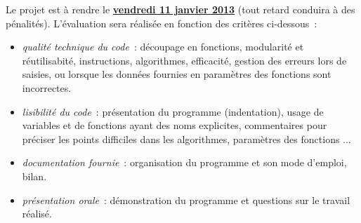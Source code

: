 \documentclass[10pt]{article}
\begin{document}
Le projet est à rendre le \underline{\bf vendredi 11 janvier 2013} 
(tout retard conduira à des pénalités). L'évaluation sera réalisée en fonction 
des critères ci-dessous~:
\begin{itemize}

\item  \textit{qualité technique du code}~: découpage en fonctions, modularité et réutilisabité, instructions, algorithmes, efficacité, gestion des erreurs lors de saisies, ou lorsque les données fournies en paramètres des fonctions sont incorrectes.

\item \textit{lisibilité du code}~: présentation du programme (indentation), usage de variables et de fonctions ayant des noms explicites, commentaires pour préciser les points difficiles dans les algorithmes, paramètres des fonctions $\ldots$ 

\item \textit{documentation fournie}~: organisation du programme et son mode d'emploi, bilan.

\item \textit{présentation orale}~: démonstration du programme et questions sur le travail r\'ealis\'e.


\end{itemize}
\end{document}
